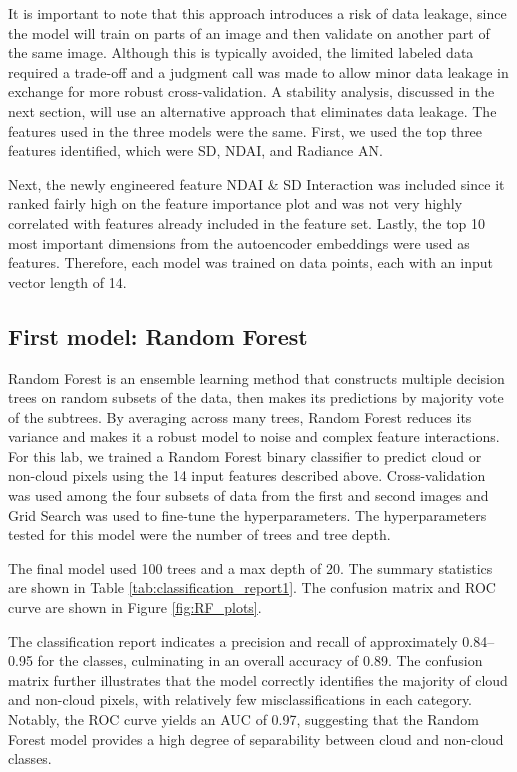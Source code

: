 \documentclass[11pt,letterpaper]{article}
\begin{document}
It is important to note that this approach introduces a risk of data leakage, since the model will train on parts of an image and then validate on another part of the same image. Although this is typically avoided, the limited labeled data required a trade-off and a judgment call was made to allow minor data leakage in exchange for more robust cross-validation. A stability analysis, discussed in the next section, will use an alternative approach that eliminates data leakage.
The features used in the three models were the same. First, we used the top three features identified, which were SD, NDAI, and Radiance AN. 


Next, the newly engineered feature NDAI \& SD Interaction was included since it ranked fairly high on the feature importance plot and was not very highly correlated with features already included in the feature set. Lastly, the top 10 most important dimensions from the autoencoder embeddings were used as features. Therefore, each model was trained on data points, each with an input vector length of 14.
\vspace{1em} %
\subsection{First model: Random Forest}
\vspace{0.5em} %
Random Forest is an ensemble learning method that constructs multiple decision trees on random subsets of the data, then makes its predictions by majority vote of the subtrees. By averaging across many trees, Random Forest reduces its variance and makes it a robust model to noise and complex feature interactions. For this lab, we trained a Random Forest binary classifier to predict cloud or non-cloud pixels using the 14 input features described above. Cross-validation was used among the four subsets of data from the first and second images and Grid Search was used to fine-tune the hyperparameters. The hyperparameters tested for this model were the number of trees and tree depth.

The final model used 100 trees and a max depth of 20. The summary statistics are shown in Table \ref{tab:classification_report1}. The confusion matrix and ROC curve are shown in Figure \ref{fig:RF_plots}.

The classification report indicates a precision and recall of approximately 0.84–0.95 for the classes, culminating in an overall accuracy of 0.89. The confusion matrix further illustrates that the model correctly identifies the majority of cloud and non-cloud pixels, with relatively few misclassifications in each category. Notably, the ROC curve yields an AUC of 0.97, suggesting that the Random Forest model provides a high degree of separability between cloud and non-cloud classes.
\end{document}
